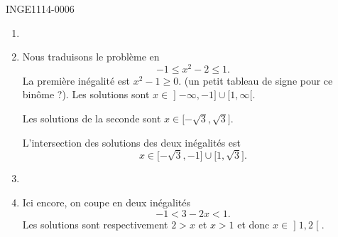 \begin{corrige}{INGE1114-0006}
\begin{enumerate}
		\item
		\item
			Nous traduisons le problème en
			\begin{equation}
				-1\leq x^2-2\leq 1.
			\end{equation}
			La première inégalité est $x^2-1\geq 0$. (un petit tableau de signe pour ce binôme ?). Les solutions sont $x\in\mathopen] -\infty , -1 \mathclose]\cup\mathopen[ 1 , \infty [$.

			Les solutions de la seconde sont $x\in\mathopen[ -\sqrt{3} , \sqrt{3} \mathclose]$.

			L'intersection des solutions des deux inégalités est
			\begin{equation}
				x\in\mathopen[ -\sqrt{3} , -1 \mathclose]\cup\mathopen[ 1 , \sqrt{3} \mathclose].
			\end{equation}
			

		\item
		\item
			Ici encore, on coupe en deux inégalités
			\begin{equation}
				-1<3-2x<1.
			\end{equation}
			Les solutions sont respectivement $2>x$ et $x>1$ et donc $x\in\mathopen] 1 , 2 \mathclose[$.



	\end{enumerate}
	

\end{corrige}
